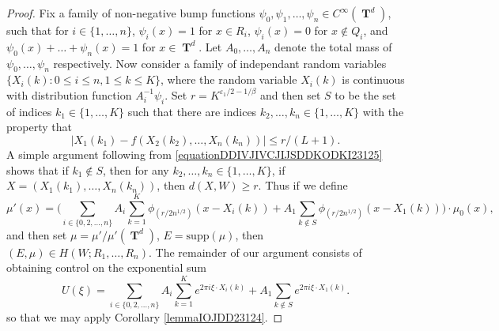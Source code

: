 \documentclass[12pt,reqno]{article}
\numberwithin{equation}{section}
\DeclareMathOperator{\TT}{\mathbf{T}}
\numberwithin{theorem}{section}
\begin{document}
\begin{proof}
    Fix a family of non-negative bump functions $\psi_0,\psi_1,\dots,\psi_n \in C^\infty(\TT^d)$, such that for $i \in \{ 1,\dots,n \}$, $\psi_i(x) = 1$ for $x \in R_i$, $\psi_i(x) = 0$ for $x \not \in Q_i$, and $\psi_0(x) + \dots + \psi_n(x) = 1$ for $x \in \TT^d$. Let $A_0,\dots,A_n$ denote the total mass of $\psi_0,\dots,\psi_n$ respectively. Now consider a family of independant random variables $\{ X_i(k) : 0 \leq i \leq n, 1 \leq k \leq K \}$, where the random variable $X_i(k)$ is continuous with distribution function $A_i^{-1} \psi_i$. Set $r = K^{\varepsilon_1/2 - 1/\beta}$
    and then set $S$ to be the set of indices $k_1 \in \{ 1, \dots, K \}$ such that there are indices $k_2,\dots,k_n \in \{ 1,\dots,K \}$ with the property that
    \begin{equation} \label{equationDDIVJIVCJIJSDDKODKI23125}
        |X_1(k_1) - f(X_2(k_2),\dots,X_n(k_n))| \leq r/(L+1).
    \end{equation}
    A simple argument following from \eqref{equationDDIVJIVCJIJSDDKODKI23125} shows that if $k_1 \not \in S$, then for any $k_2,\dots,k_n \in \{ 1, \dots, K \}$, if $X = (X_1(k_1),\dots,X_n(k_n))$, then $d(X,W) \geq r$. Thus if we define
    \begin{equation}
        \mu'(x) = \Bigg( \sum_{i \in \{ 0, 2, \dots, n \}} A_i \sum_{k = 1}^K \phi_{(r/2n^{1/2})}(x - X_i(k)) + A_1 \sum_{k \not \in S} \phi_{(r/2n^{1/2})}(x - X_1(k)) \Bigg) \cdot \mu_0(x),
    \end{equation}
    and then set $\mu = \mu'/\mu'(\TT^d)$, $E = \text{supp}(\mu)$, then $(E,\mu) \in H(W;R_1,\dots,R_n)$. The remainder of our argument consists of obtaining control on the exponential sum
    \begin{equation}
        U(\xi) = \sum_{i \in \{ 0, 2, \dots, n \}} A_i \sum_{k = 1}^K e^{2 \pi i \xi \cdot X_i(k)} + A_1 \sum_{k \not \in S} e^{2 \pi i \xi \cdot X_1(k)}.
    \end{equation}
    so that we may apply Corollary \ref{lemmaIOJDD23124}.%


\end{proof}
\end{document}
